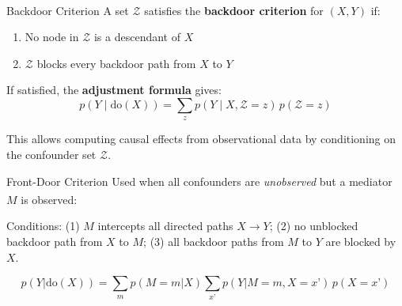 \begin{v3topic}{Backdoor Criterion}
    A set $\mathcal{Z}$ satisfies the \textbf{backdoor criterion} for
    $(X,Y)$ if:\textsuperscript{\cite[][pp.~79--81]{pearlCausalityModelsReasoning2009}}
    \begin{enumerate}
        \item No node in $\mathcal{Z}$ is a descendant of $X$
        \item $\mathcal{Z}$ blocks every backdoor path from $X$ to $Y$
    \end{enumerate}

    If satisfied, the \textbf{adjustment formula} gives:
    \begin{equation}
        p(Y \mid \mathrm{do}(X)) = \sum_{z} p(Y \mid X, \mathcal{Z}{=}z)\,p(\mathcal{Z}{=}z)
    \end{equation}

    This allows computing causal effects from observational data by conditioning
    on the confounder set $\mathcal{Z}$.

\end{v3topic}
\begin{v3topic}{Front-Door Criterion}
    Used when all confounders are \emph{unobserved} but a mediator $M$ is
    observed:\textsuperscript{\cite[][pp.~82--84]{pearlCausalityModelsReasoning2009}}

    Conditions: (1) $M$ intercepts all directed paths $X \to Y$; (2) no
    unblocked backdoor path from $X$ to $M$; (3) all backdoor paths from $M$
    to $Y$ are blocked by $X$.

    \begin{equation}
        p(Y|\mathrm{do}(X)) = \sum_m p(M{=}m|X)
            \sum_{x’} p(Y|M{=}m, X{=}x’)\,p(X{=}x’)
    \end{equation}

\end{v3topic}
